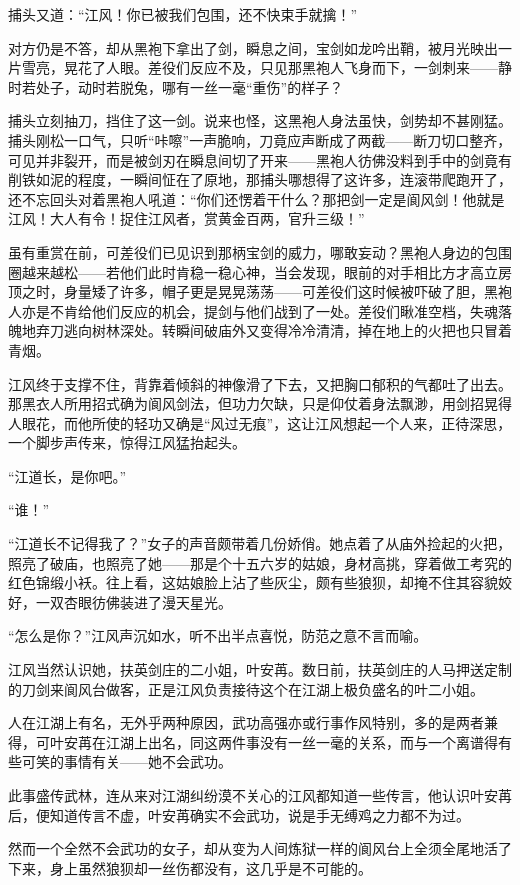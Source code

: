 捕头又道：“江风！你已被我们包围，还不快束手就擒！”

对方仍是不答，却从黑袍下拿出了剑，瞬息之间，宝剑如龙吟出鞘，被月光映出一片雪亮，晃花了人眼。差役们反应不及，只见那黑袍人飞身而下，一剑刺来——静时若处子，动时若脱兔，哪有一丝一毫“重伤”的样子？

捕头立刻抽刀，挡住了这一剑。说来也怪，这黑袍人身法虽快，剑势却不甚刚猛。捕头刚松一口气，只听“咔嚓”一声脆响，刀竟应声断成了两截——断刀切口整齐，可见并非裂开，而是被剑刃在瞬息间切了开来——黑袍人彷佛没料到手中的剑竟有削铁如泥的程度，一瞬间怔在了原地，那捕头哪想得了这许多，连滚带爬跑开了，还不忘回头对着黑袍人吼道：“你们还愣着干什么？那把剑一定是阆风剑！他就是江风！大人有令！捉住江风者，赏黄金百两，官升三级！”

虽有重赏在前，可差役们已见识到那柄宝剑的威力，哪敢妄动？黑袍人身边的包围圈越来越松——若他们此时肯稳一稳心神，当会发现，眼前的对手相比方才高立房顶之时，身量矮了许多，帽子更是晃晃荡荡——可差役们这时候被吓破了胆，黑袍人亦是不肯给他们反应的机会，提剑与他们战到了一处。差役们瞅准空档，失魂落魄地弃刀逃向树林深处。转瞬间破庙外又变得冷冷清清，掉在地上的火把也只冒着青烟。

江风终于支撑不住，背靠着倾斜的神像滑了下去，又把胸口郁积的气都吐了出去。那黑衣人所用招式确为阆风剑法，但功力欠缺，只是仰仗着身法飘渺，用剑招晃得人眼花，而他所使的轻功又确是“风过无痕”，这让江风想起一个人来，正待深思，一个脚步声传来，惊得江风猛抬起头。

“江道长，是你吧。”

“谁！”

“江道长不记得我了？”女子的声音颇带着几份娇俏。她点着了从庙外捡起的火把，照亮了破庙，也照亮了她——那是个十五六岁的姑娘，身材高挑，穿着做工考究的红色锦缎小袄。往上看，这姑娘脸上沾了些灰尘，颇有些狼狈，却掩不住其容貌姣好，一双杏眼彷佛装进了漫天星光。

“怎么是你？”江风声沉如水，听不出半点喜悦，防范之意不言而喻。

江风当然认识她，扶英剑庄的二小姐，叶安苒。数日前，扶英剑庄的人马押送定制的刀剑来阆风台做客，正是江风负责接待这个在江湖上极负盛名的叶二小姐。

人在江湖上有名，无外乎两种原因，武功高强亦或行事作风特别，多的是两者兼得，可叶安苒在江湖上出名，同这两件事没有一丝一毫的关系，而与一个离谱得有些可笑的事情有关——她不会武功。

此事盛传武林，连从来对江湖纠纷漠不关心的江风都知道一些传言，他认识叶安苒后，便知道传言不虚，叶安苒确实不会武功，说是手无缚鸡之力都不为过。

然而一个全然不会武功的女子，却从变为人间炼狱一样的阆风台上全须全尾地活了下来，身上虽然狼狈却一丝伤都没有，这几乎是不可能的。


